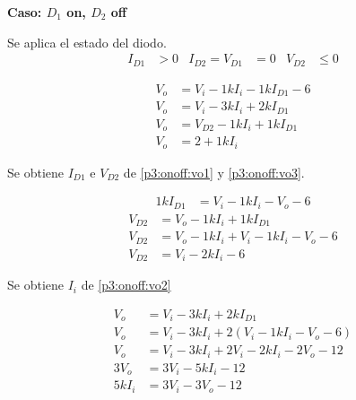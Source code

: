 %
%
%

\bigskip

\textbf{Caso: $D_1$ on, $D_2$ off}

Se aplica el estado del diodo.
\begin{align*}
  I_{D1} &> 0
  &
  I_{D2} = V_{D1} &= 0
  &
  V_{D2} &\leq 0
\end{align*}

\begin{align}
  V_o &= V_i - 1k I_i - 1k I_{D1} - 6 \label{p3:onoff:vo1}
  \\
  V_o &= V_i - 3k I_i + 2k I_{D1} \label{p3:onoff:vo2}
  \\
  V_o &= V_{D2} - 1k I_i + 1k I_{D1} \label{p3:onoff:vo3}
  \\
  V_o &= 2 + 1k I_i \label{p3:onoff:vo4}
\end{align}

Se obtiene $I_{D1}$ e $V_{D2}$ de \ref{p3:onoff:vo1} y \ref{p3:onoff:vo3}.

\begin{align*}
  1k I_{D1} &= V_i - 1k I_i - V_o - 6
\end{align*}
\begin{align*}
  V_{D2} &= V_o - 1k I_i + 1k I_{D1}
  \\
  V_{D2} &= V_o - 1k I_i + V_i - 1k I_i - V_o - 6
  \\
  V_{D2} &= V_i - 2k I_i - 6
\end{align*}

Se obtiene $I_i$ de \ref{p3:onoff:vo2}

\begin{align*}
  V_o &= V_i - 3k I_i + 2k I_{D1}
  \\
  V_o &= V_i - 3k I_i + 2 \left(V_i - 1k I_i - V_o - 6\right)
  \\
  V_o &= V_i - 3k I_i + 2 V_i - 2k I_i - 2 V_o - 12
  \\
  3 V_o &= 3 V_i - 5k I_i - 12
  \\
  5k I_i &= 3 V_i - 3 V_o - 12
  \end{align*}

